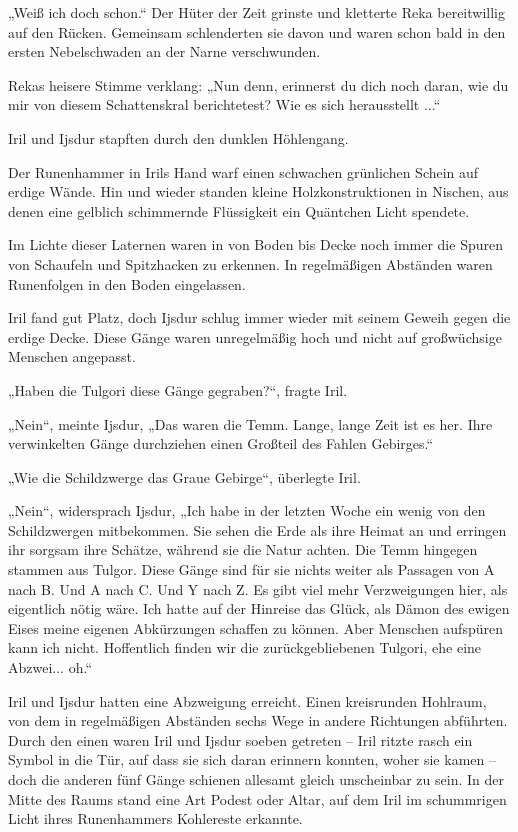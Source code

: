 „Weiß ich doch schon.“ Der Hüter der Zeit grinste und kletterte Reka bereitwillig auf den Rücken. Gemeinsam schlenderten sie davon und waren schon bald in den ersten Nebelschwaden an der Narne verschwunden.

Rekas heisere Stimme verklang: „Nun denn, erinnerst du dich noch daran, wie du mir von diesem Schattenskral berichtetest? Wie es sich herausstellt ...“



\trennzeichen



Iril und Ijsdur stapften durch den dunklen Höhlengang.

Der Runenhammer in Irils Hand warf einen schwachen grünlichen Schein auf erdige Wände. Hin und wieder standen kleine Holzkonstruktionen in Nischen, aus denen eine gelblich schimmernde Flüssigkeit ein Quäntchen Licht spendete.

Im Lichte dieser Laternen waren in von Boden bis Decke noch immer die Spuren von Schaufeln und Spitzhacken zu erkennen. In regelmäßigen Abständen waren Runenfolgen in den Boden eingelassen.

Iril fand gut Platz, doch Ijsdur schlug immer wieder mit seinem Geweih gegen die erdige Decke. Diese Gänge waren unregelmäßig hoch und nicht auf großwüchsige Menschen angepasst.

„Haben die Tulgori diese Gänge gegraben?“, fragte Iril.

„Nein“, meinte Ijsdur, „Das waren die Temm. Lange, lange Zeit ist es her. Ihre verwinkelten Gänge durchziehen einen Großteil des Fahlen Gebirges.“

„Wie die Schildzwerge das Graue Gebirge“, überlegte Iril.

„Nein“, widersprach Ijsdur, „Ich habe in der letzten Woche ein wenig von den Schildzwergen mitbekommen. Sie sehen die Erde als ihre Heimat an und erringen ihr sorgsam ihre Schätze, während sie die Natur achten. Die Temm hingegen stammen aus Tulgor. Diese Gänge sind für sie nichts weiter als Passagen von A nach B. Und A nach C. Und Y nach Z. Es gibt viel mehr Verzweigungen hier, als eigentlich nötig wäre. Ich hatte auf der Hinreise das Glück, als Dämon des ewigen Eises meine eigenen Abkürzungen schaffen zu können. Aber Menschen aufspüren kann ich nicht. Hoffentlich finden wir die zurückgebliebenen Tulgori, ehe eine Abzwei... oh.“

Iril und Ijsdur hatten eine Abzweigung erreicht. Einen kreisrunden Hohlraum, von dem in regelmäßigen Abständen sechs Wege in andere Richtungen abführten. Durch den einen waren Iril und Ijsdur soeben getreten – Iril ritzte rasch ein Symbol in die Tür, auf dass sie sich daran erinnern konnten, woher sie kamen – doch die anderen fünf Gänge schienen allesamt gleich unscheinbar zu sein. In der Mitte des Raums stand eine Art Podest oder Altar, auf dem Iril im schummrigen Licht ihres Runenhammers Kohlereste erkannte.

